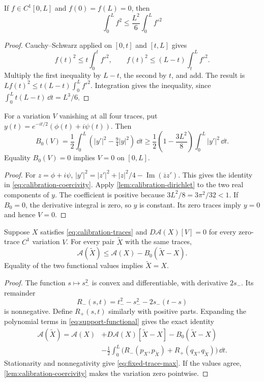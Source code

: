 \begin{lemma}\label{lem:calibration-dirichlet}
If $f\in C^1[0,L]$ and $f(0)=f(L)=0$, then
\[
 \int_0^L f^2\le\frac{L^2}{6}\int_0^L f'^2
\]
\end{lemma}
\begin{proof}
Cauchy--Schwarz applied on $[0,t]$ and $[t,L]$ gives
\[
 f(t)^2\le t\int_0^t f'^2,\qquad
 f(t)^2\le(L-t)\int_t^L f'^2.
\]
Multiply the first inequality by $L-t$, the second by $t$, and add.
The result is
$Lf(t)^2\le t(L-t)\int_0^L f'^2$. Integration gives the
inequality, since $\int_0^L t(L-t)\,\dd t=L^3/6$.
\end{proof}

\begin{lemma}\label{lem:calibration-coercivity}
For a variation $V$ vanishing at all four traces, put
$y(t)=e^{-it/2}(\phi(t)+i\psi(t))$. Then
\begin{equation}\label{eq:calibration-coercivity}
 B_0(V)=\frac12\int_0^L
           (|y'|^2-\tfrac94|y|^2)\,\dd t
       \ge\frac12\left(1-\frac{3L^2}{8}\right)
             \int_0^L|y'|^2\,\dd t.
\end{equation}
Equality $B_0(V)=0$ implies $V=0$ on $[0,L]$.
\end{lemma}
\begin{proof}
For $z=\phi+i\psi$,
$|y'|^2=|z'|^2+|z|^2/4-\operatorname{Im}(\overline z z')$.
This gives the identity in \cref{eq:calibration-coercivity}.
Apply \cref{lem:calibration-dirichlet} to the two real components of
$y$. The coefficient is positive because
$3L^2/8=3\pi^2/32<1$.
If $B_0=0$, the derivative integral is zero, so $y$ is constant.
Its zero traces imply $y=0$ and hence $V=0$.
\end{proof}

\begin{theorem}\label{thm:fixed-trace-max}
Suppose $X$ satisfies \cref{eq:calibration-traces} and
$D\mathcal A(X)[V]=0$ for every zero-trace $C^1$ variation $V$.
For every pair $\widetilde X$ with the same traces,
\begin{equation}\label{eq:fixed-trace-max}
 \mathcal A(\widetilde X)\le\mathcal A(X)-B_0(\widetilde X-X).
\end{equation}
Equality of the two functional values implies $\widetilde X=X$.
\end{theorem}
\begin{proof}
The function $s\mapsto s_-^2$ is convex and differentiable, with
derivative $2s_-$. Its remainder
\[
 R_-(s,t)=t_-^2-s_-^2-2s_-(t-s)
\]
is nonnegative. Define $R_+(s,t)$ similarly with positive parts.
Expanding the polynomial terms in
\cref{eq:support-functional} gives the exact identity
\begin{align*}
 \mathcal A(\widetilde X)=\mathcal A(X)
 &+D\mathcal A(X)[\widetilde X-X]-B_0(\widetilde X-X)\\
 &-\tfrac12\int_0^L
  \bigl(R_-(p_X,p_{\widetilde X})+R_+(q_X,q_{\widetilde X})\bigr)\,\dd t.
\end{align*}
Stationarity and nonnegativity give \cref{eq:fixed-trace-max}.
If the values agree, \cref{lem:calibration-coercivity} makes the
variation zero pointwise.
\end{proof}

